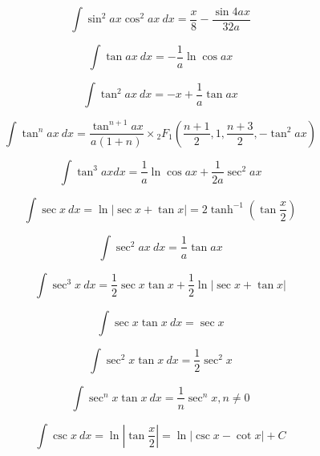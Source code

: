 \begin{equation*}
\int \sin^2 ax \cos^2 ax\ dx = \frac{x}{8}-\frac{\sin 4ax}{32a}
\end{equation*}

\begin{equation*}
\int \tan ax\ dx = -\frac{1}{a} \ln \cos ax 
\end{equation*}

\begin{equation*}
\int \tan^2 ax\ dx = -x + \frac{1}{a} \tan ax 
\end{equation*}

\begin{equation*}
\int \tan^n ax\ dx = 
\frac{\tan^{n+1} ax }{a(1+n)} \times
{_2}F_1\left( \frac{n+1}{2}, 
1, \frac{n+3}{2}, -\tan^2 ax \right) 
\end{equation*}

\begin{equation*}
\int \tan^3 ax dx = \frac{1}{a} \ln \cos ax + \frac{1}{2a}\sec^2 ax 
\end{equation*}

\begin{equation*}
\int \sec x \ dx = \ln | \sec x + \tan x | = 2 \tanh^{-1} \left (\tan \frac{x}{2} \right) 
\end{equation*}

\begin{equation*}
\int \sec^2 ax\ dx = \frac{1}{a} \tan ax 
\end{equation*}

\begin{equation*}\label{eq:Kloeppel}
\int \sec^3 x \ {dx} = \frac{1}{2} \sec x \tan x + \frac{1}{2}\ln | \sec x + \tan x |
\end{equation*}

\begin{equation*}
\int \sec x \tan x\ dx = \sec x 
\end{equation*}

\begin{equation*}
\int \sec^2 x \tan x\ dx = \frac{1}{2} \sec^2 x 
\end{equation*}

\begin{equation*}
\int \sec^n x \tan x \ dx = \frac{1}{n} \sec^n x , n\ne 0
\end{equation*}

\begin{equation*}
\int \csc x\ dx = \ln \left | \tan \frac{x}{2} \right|  = \ln | \csc x - \cot x| + C
\end{equation*}

